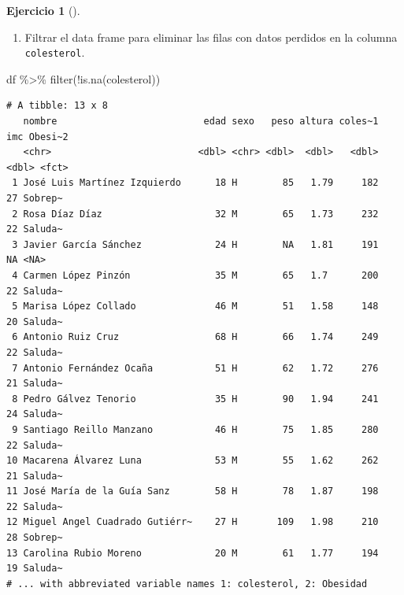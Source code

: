\documentclass[
  a4paper,
]{scrreport}
\newenvironment{Shaded}{\begin{snugshade}}{\end{snugshade}}
\newcommand{\FunctionTok}[1]{\textcolor[rgb]{0.28,0.35,0.67}{#1}}
\newcommand{\NormalTok}[1]{\textcolor[rgb]{0.00,0.23,0.31}{#1}}
\newcommand{\SpecialCharTok}[1]{\textcolor[rgb]{0.37,0.37,0.37}{#1}}
\providecommand{\tightlist}{%
  \setlength{\itemsep}{0pt}\setlength{\parskip}{0pt}}\usepackage{longtable,booktabs,array}
\theoremstyle{definition}
\newtheorem{exercise}{Ejercicio}[chapter]
\theoremstyle{remark}
\begin{document}
\begin{exercise}[]
\begin{tcolorbox}
\end{tcolorbox}

\begin{enumerate}
\def\labelenumi{\roman{enumi}.}
\tightlist
\item
  Filtrar el data frame para eliminar las filas con datos perdidos en la
  columna \texttt{colesterol}.
\end{enumerate}

\begin{tcolorbox}[enhanced jigsaw, rightrule=.15mm, toptitle=1mm, colbacktitle=quarto-callout-tip-color!10!white, titlerule=0mm, colback=white, leftrule=.75mm, bottomtitle=1mm, colframe=quarto-callout-tip-color-frame, breakable, title=\textcolor{quarto-callout-tip-color}{\faLightbulb}\hspace{0.5em}{Solución}, arc=.35mm, coltitle=black, opacityback=0, bottomrule=.15mm, opacitybacktitle=0.6, left=2mm, toprule=.15mm]

\begin{Shaded}
\begin{Highlighting}[]
\NormalTok{df }\SpecialCharTok{\%\textgreater{}\%}
    \FunctionTok{filter}\NormalTok{(}\SpecialCharTok{!}\FunctionTok{is.na}\NormalTok{(colesterol))}
\end{Highlighting}
\end{Shaded}

\begin{verbatim}
# A tibble: 13 x 8
   nombre                          edad sexo   peso altura coles~1   imc Obesi~2
   <chr>                          <dbl> <chr> <dbl>  <dbl>   <dbl> <dbl> <fct>  
 1 José Luis Martínez Izquierdo      18 H        85   1.79     182    27 Sobrep~
 2 Rosa Díaz Díaz                    32 M        65   1.73     232    22 Saluda~
 3 Javier García Sánchez             24 H        NA   1.81     191    NA <NA>   
 4 Carmen López Pinzón               35 M        65   1.7      200    22 Saluda~
 5 Marisa López Collado              46 M        51   1.58     148    20 Saluda~
 6 Antonio Ruiz Cruz                 68 H        66   1.74     249    22 Saluda~
 7 Antonio Fernández Ocaña           51 H        62   1.72     276    21 Saluda~
 8 Pedro Gálvez Tenorio              35 H        90   1.94     241    24 Saluda~
 9 Santiago Reillo Manzano           46 H        75   1.85     280    22 Saluda~
10 Macarena Álvarez Luna             53 M        55   1.62     262    21 Saluda~
11 José María de la Guía Sanz        58 H        78   1.87     198    22 Saluda~
12 Miguel Angel Cuadrado Gutiérr~    27 H       109   1.98     210    28 Sobrep~
13 Carolina Rubio Moreno             20 M        61   1.77     194    19 Saluda~
# ... with abbreviated variable names 1: colesterol, 2: Obesidad
\end{verbatim}


\end{tcolorbox}
\end{exercise}
\end{document}
